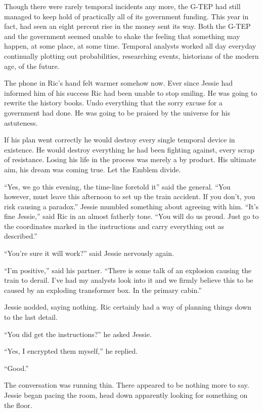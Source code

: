 Though there were rarely temporal incidents any more, the G-TEP had still managed to keep hold of practically all of its government funding.  This year in fact, had seen an eight percent rise in the money sent its way.  Both the G-TEP and the government seemed unable to shake the feeling that something may happen, at some place, at some time.  Temporal analysts worked all day everyday continually plotting out probabilities, researching events, historians of the modern age, of the future.  

The phone in Ric's hand felt warmer somehow now.  Ever since Jessie had informed him of his success Ric had been unable to stop smiling.  He was going to rewrite the history books.  Undo everything that the sorry excuse for a government had done.  He was going to be praised by the universe for his astuteness.  

If his plan went correctly he would destroy every single temporal device in existence.  He would destroy everything he had been fighting against, every scrap of resistance.  Losing his life in the process was merely a by product.  His ultimate aim, his dream was coming true.  Let the Emblem divide.

``Yes, we go this evening, the time-line foretold it'' said the general.  ``You however, must leave this afternoon to set up the train accident.  If you don't, you risk causing a paradox.''  Jessie mumbled something about agreeing with him.  ``It's fine Jessie,'' said Ric in an almost fatherly tone.  ``You will do us proud.  Just go to the coordinates marked in the instructions and carry everything out as described.''

``You're sure it will work?'' said Jessie nervously again.

``I'm positive,'' said his partner.  ``There is some talk of an explosion causing the train to derail.  I've had my analysts look into it and we firmly believe this to be caused by an exploding transformer box.  In the primary cabin.''

Jessie nodded, saying nothing.  Ric certainly had a way of planning things down to the last detail.  

``You did get the instructions?'' he asked Jessie.

``Yes, I encrypted them myself,'' he replied.  

``Good.''

The conversation was running thin.  There appeared to be nothing more to say.  Jessie began pacing the room, head down apparently looking for something on the floor.


